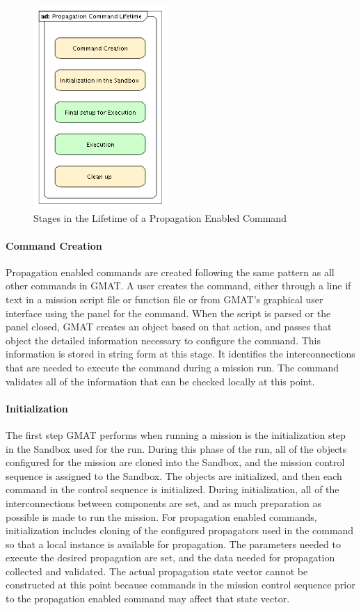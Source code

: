 \documentclass[11pt]{article}
\begin{document}
\begin{figure}[htb]
\begin{center}
\includegraphics[width=2in]{Images/PropagationCommandLifetime.png}
\caption{Stages in the Lifetime of a Propagation Enabled Command}
\label{fig:PropLifetime}
\end{center}
\end{figure}

\paragraph{Command Creation}

Propagation enabled commands are created following the same pattern as all other commands in GMAT.  A user creates the command, either through a line if text in a mission script file or function file or from GMAT's graphical user interface using the panel for the command.  When the script is parsed or the panel closed, GMAT creates an object based on that action, and passes that object the detailed information necessary to configure the command.  This information is stored in string form at this stage.  It identifies the interconnections that are needed to execute the command during a mission run.  The command validates all of the information that can be checked locally at this point.

\paragraph{Initialization}

The first step GMAT performs when running a mission is the initialization step in the Sandbox used for the run.  During this phase of the run, all of the objects configured for the mission are cloned into the Sandbox, and the mission control sequence is assigned to the Sandbox.  The objects are initialized, and then each command in the control sequence is initialized.  During initialization, all of the interconnections between components are set, and as much preparation as possible is made to run the mission.  For propagation enabled commands, initialization includes cloning of the configured propagators used in the command so that a local instance is available for propagation.  The parameters needed to execute the desired propagation are set, and the data needed for propagation collected and validated.  The actual propagation state vector cannot be constructed at this point because commands in the mission control sequence prior to the propagation enabled command may affect that state vector.
\end{document}
